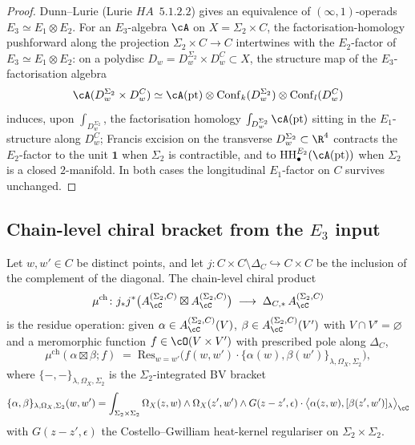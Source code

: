 \begin{proof}
Dunn--Lurie (Lurie $HA$~$5.1.2.2$) gives an equivalence of $(\infty,1)$-operads $E_3\simeq E_1\otimes E_2$. For an $E_3$-algebra $\cA$ on $X=\Sigma_2\times C$, the factorisation-homology pushforward along the projection $\Sigma_2\times C\to C$ intertwines with the $E_{2}$-factor of $E_3\simeq E_1\otimes E_2$: on a polydisc $D_w=D_w^{\Sigma_2}\times D_w^C\subset X$, the structure map of the $E_3$-factorisation algebra
\[
 \cA(D_w^{\Sigma_2}\times D_w^C)
 \simeq
 \cA(\mathrm{pt})\otimes\mathrm{Conf}_k(D_w^{\Sigma_2})
 \otimes\mathrm{Conf}_l(D_w^C)
\]
induces, upon $\int_{D_w^{\Sigma_2}}$, the factorisation homology $\int_{D_w^{\Sigma_2}}\cA(\mathrm{pt})$ sitting in the $E_1$-structure along $D_w^C$; Francis excision on the transverse $D_w^{\Sigma_2}\subset\R^4$ contracts the $E_2$-factor to the unit $\mathbf 1$ when $\Sigma_2$ is contractible, and to $\mathrm{HH}_\bullet^{E_2}(\cA(\mathrm{pt}))$ when $\Sigma_2$ is a closed $2$-manifold. In both cases the longitudinal $E_1$-factor on $C$ survives unchanged.
\end{proof}

\subsection{Chain-level chiral bracket from the \texorpdfstring{$E_3$}{E-3} input}
\label{wn:subsec:agent3-chiral-bracket}

\begin{definition}
\label{wn:def:agent3-chiral-product}
Let $w,w'\in C$ be distinct points, and let $j\colon C\times C\setminus\Delta_C\hookrightarrow C\times C$ be the inclusion of the complement of the diagonal. The chain-level chiral product
\[
 \mu^{\mathrm{ch}}\colon
 j_*j^*\bigl(A^{(\Sigma_2,C)}_\cC\boxtimes A^{(\Sigma_2,C)}_\cC\bigr)
 \;\longrightarrow\;
 \Delta_{C,*}\,A^{(\Sigma_2,C)}_\cC
\]
is the residue operation: given $\alpha\in A^{(\Sigma_2,C)}_\cC(V)$, $\beta\in A^{(\Sigma_2,C)}_\cC(V')$ with $V\cap V'=\varnothing$ and a meromorphic function $f\in\cO(V\times V')$ with prescribed pole along $\Delta_C$,
\[
 \mu^{\mathrm{ch}}(\alpha\boxtimes\beta;f)
 \;=\;
 \mathrm{Res}_{w=w'}\bigl(f(w,w')\cdot
 \{\alpha(w),\beta(w')\}_{\lambda,\Omega_X,\Sigma_2}\bigr),
\]
where $\{-,-\}_{\lambda,\Omega_X,\Sigma_2}$ is the $\Sigma_2$-integrated BV bracket
\[
 \{\alpha,\beta\}_{\lambda,\Omega_X,\Sigma_2}(w,w')
 =
 \int_{\Sigma_2\times\Sigma_2}
 \Omega_X(z,w)\wedge\Omega_X(z',w')\wedge
 G(z-z',\epsilon)\cdot
 \bigl\langle\alpha(z,w),[\beta(z',w')]_\lambda\bigr\rangle_\cC
\]
with $G(z-z',\epsilon)$ the Costello--Gwilliam heat-kernel regulariser on $\Sigma_2\times\Sigma_2$.
\end{definition}

